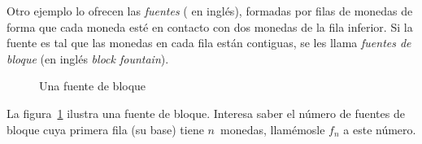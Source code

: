   Otro ejemplo lo ofrecen las \emph{fuentes}
  (\emph{} en inglés),%
  formadas por filas de monedas
  de forma que cada moneda esté en contacto
  con dos monedas de la fila inferior.
  Si la fuente es tal que las monedas en cada fila están contiguas,
  se les llama \emph{fuentes de bloque}%
  (en inglés \emph{\foreignlanguage{english}{block fountain}}).%
  \begin{figure}[ht]
    \centering
    \caption{Una fuente de bloque}
    \label{fig:fountain}
  \end{figure}
  La figura~\ref{fig:fountain} ilustra una fuente de bloque.
  Interesa saber el número de fuentes de bloque
  cuya primera fila
  (su base)
  tiene \(n\)~monedas,
  llamémosle \(f_n\) a este número.

